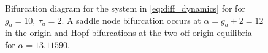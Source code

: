 \begin{figure}[H]
        \caption{\label{fig:bif_hopf_matcont} Bifurcation diagram for the system in \eqref{eq:diff_dynamics} for  for $g_a=10,\ \tau_a=2$. A saddle node bifurcation occurs at $\alpha = g_a + 2 = 12$ in the origin and Hopf bifurcations at the two off-origin equilibria for $\alpha=13.11590$.}
\end{figure}


